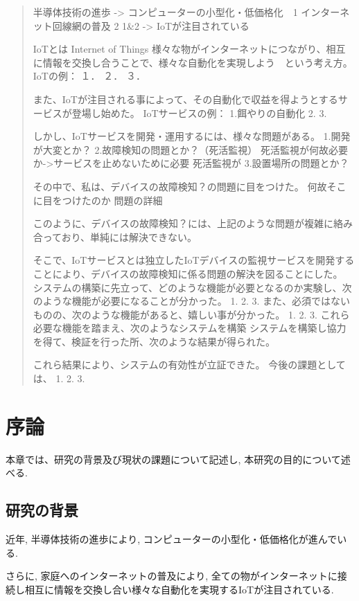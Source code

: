\documentclass[a4paper]{jreport}
\begin{document}
\begin{abstract}
 半導体技術の進歩 -> コンピューターの小型化・低価格化　1
 インターネット回線網の普及 2
 1&2 -> IoTが注目されている

 IoTとは
 Internet of Things
 様々な物がインターネットにつながり、相互に情報を交換し合うことで、様々な自動化を実現しよう　という考え方。
 IoTの例：
１．
２．
３．

 また、IoTが注目される事によって、その自動化で収益を得ようとするサービスが登場し始めた。
 IoTサービスの例：
 1.餌やりの自動化
 2.
 3.

 しかし、IoTサービスを開発・運用するには、様々な問題がある。
 1.開発が大変とか？
 2.故障検知の問題とか？（死活監視）
	死活監視が何故必要か->サービスを止めないために必要
	死活監視が
 3.設置場所の問題とか？

その中で、私は、デバイスの故障検知？の問題に目をつけた。
何故そこに目をつけたのか
問題の詳細

このように、デバイスの故障検知？には、上記のような問題が複雑に絡み合っており、単純には解決できない。

そこで、IoTサービスとは独立したIoTデバイスの監視サービスを開発することにより、デバイスの故障検知に係る問題の解決を図ることにした。
システムの構築に先立って、どのような機能が必要となるのか実験し、次のような機能が必要になることが分かった。
1.
2.
3.
また、必須ではないものの、次のような機能があると、嬉しい事が分かった。
1.
2.
3.
これら必要な機能を踏まえ、次のようなシステムを構築
システムを構築し協力を得て、検証を行った所、次のような結果が得られた。

これら結果により、システムの有効性が立証できた。
今後の課題としては、
1.
2.
3.
\end{abstract}

\chapter{序論}
本章では、研究の背景及び現状の課題について記述し, 本研究の目的について述べる.
\section{研究の背景}
近年, 半導体技術の進歩により, コンピューターの小型化・低価格化が進んでいる. 


さらに, 家庭へのインターネットの普及により, 全ての物がインターネットに接続し相互に情報を交換し合い様々な自動化を実現するIoTが注目されている.\\
\end{document}
